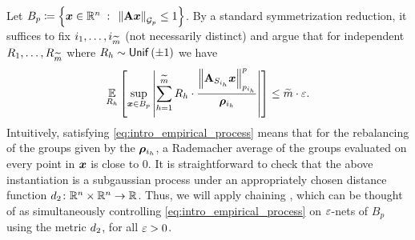 \documentclass[11pt]{article}
\numberwithin{equation}{section}
\begin{document}

Let $B_p \coloneqq \left\{\bm{x}\in\mathbb{R}^n{\;\; : \;\;}\left\lVert \mathbf{A}\bm{x} \right\rVert_{\mathcal{G}_{p}}\le1\right\}$. By a standard symmetrization reduction, it suffices to fix $i_1,\dots,i_{\widetilde{m}}$ (not necessarily distinct) and argue that for independent $R_1,\dots,R_{\widetilde{m}}$ where $R_h \sim \mathsf{Unif}\left(\pm 1\right)$ we have
\begin{align}
    \underset{R_h}{\mathbb{E}}\left[\sup_{\bm{x} \in B_{p}} \left\lvert \sum_{h=1}^{\widetilde{m}} R_h \cdot \frac{\left\lVert \mathbf{A}_{S_{i_h}}\bm{x} \right\rVert_{p_{i_h}}^p}{\bm{\rho}_{i_h}} \right\rvert\right] \le \widetilde{m}\cdot\varepsilon.\label{eq:intro_empirical_process}
\end{align}
Intuitively, satisfying \eqref{eq:intro_empirical_process} means that for the rebalancing of the groups given by the $\bm{\rho}_{i_h}$, a Rademacher average of the groups evaluated on every point in $\bm{x}$ is close to $0$. It is straightforward to check that the above instantiation is a subgaussian process under an appropriately chosen distance function $d_2\colon\mathbb{R}^{n} \times \mathbb{R}^{n}\rightarrow\mathbb{R}$. Thus, we will apply chaining \cite{tal21}, which can be thought of as simultaneously controlling \eqref{eq:intro_empirical_process} on $\varepsilon$-nets of $B_p$ using the metric $d_2$, for all $\varepsilon>0$.
\end{document}
